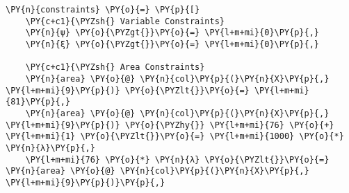 \begin{tcolorbox}[breakable, size=fbox, boxrule=1pt, pad at break*=1mm,colback=cellbackground, colframe=cellborder]
    \begin{Verbatim}[commandchars=\\\{\}]
\PY{n}{constraints} \PY{o}{=} \PY{p}{[}
    \PY{c+c1}{\PYZsh{} Variable Constraints}
    \PY{n}{ψ} \PY{o}{\PYZgt{}}\PY{o}{=} \PY{l+m+mi}{0}\PY{p}{,}
    \PY{n}{ξ} \PY{o}{\PYZgt{}}\PY{o}{=} \PY{l+m+mi}{0}\PY{p}{,}

    \PY{c+c1}{\PYZsh{} Area Constraints}
    \PY{n}{area} \PY{o}{@} \PY{n}{col}\PY{p}{(}\PY{n}{X}\PY{p}{,} \PY{l+m+mi}{9}\PY{p}{)} \PY{o}{\PYZlt{}}\PY{o}{=} \PY{l+m+mi}{81}\PY{p}{,}
    \PY{n}{area} \PY{o}{@} \PY{n}{col}\PY{p}{(}\PY{n}{X}\PY{p}{,} \PY{l+m+mi}{9}\PY{p}{)} \PY{o}{\PYZhy{}} \PY{l+m+mi}{76} \PY{o}{+} \PY{l+m+mi}{1} \PY{o}{\PYZlt{}}\PY{o}{=} \PY{l+m+mi}{1000} \PY{o}{*} \PY{n}{λ}\PY{p}{,}
    \PY{l+m+mi}{76} \PY{o}{*} \PY{n}{λ} \PY{o}{\PYZlt{}}\PY{o}{=} \PY{n}{area} \PY{o}{@} \PY{n}{col}\PY{p}{(}\PY{n}{X}\PY{p}{,} \PY{l+m+mi}{9}\PY{p}{)}\PY{p}{,}


\end{Verbatim}
\end{tcolorbox}
